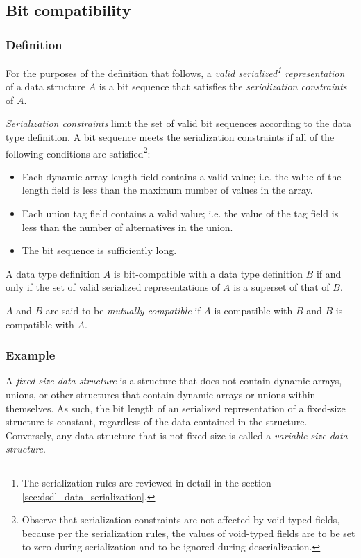 \subsection{Bit compatibility}

\subsubsection{Definition}

For the purposes of the definition that follows, a \emph{valid
serialized\footnote{The serialization rules are reviewed in detail in the section \ref{sec:dsdl_data_serialization}.}
representation} of a data structure $A$ is a bit sequence that satisfies the \emph{serialization constraints} of $A$.

\emph{Serialization constraints} limit the set of valid bit sequences according to the data type definition.
A bit sequence meets the serialization constraints if all of the following conditions are
satisfied\footnote{Observe that serialization constraints are not affected by void-typed fields,
because per the serialization rules, the values of void-typed fields are to be set to zero during serialization
and to be ignored during deserialization.}:
\begin{itemize}
    \item Each dynamic array length field contains a valid value;
    i.e. the value of the length field is less than the maximum number of values in the array.

    \item Each union tag field contains a valid value;
    i.e. the value of the tag field is less than the number of alternatives in the union.

    \item The bit sequence is sufficiently long.
\end{itemize}

A data type definition $A$ is bit-compatible with a data type definition $B$ if and only if
the set of valid serialized representations of $A$ is a superset of that of $B$.

$A$ and $B$ are said to be \emph{mutually compatible} if
$A$ is compatible with $B$ and $B$ is compatible with $A$.

\subsubsection{Example}

A \emph{fixed-size data structure} is a structure that does not contain dynamic arrays,
unions, or other structures that contain dynamic arrays or unions within themselves.
As such, the bit length of an serialized representation of a fixed-size structure is constant,
regardless of the data contained in the structure.
Conversely, any data structure that is not fixed-size is called a \emph{variable-size data structure}.

